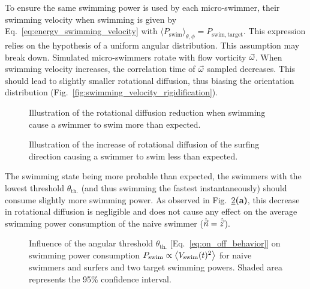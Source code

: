 To ensure the same swimming power is used by each micro-swimmer, their swimming velocity when swimming is given by Eq.~\eqref{eq:energy_swimming_velocity} with $\langle P_{\mathrm{swim}} \rangle_{\theta, \phi} = P_{\mathrm{swim}, \mathrm{target}}$.
This expression relies on the hypothesis of a uniform angular distribution.
This assumption may break down.
Simulated micro-swimmers rotate with flow vorticity $\vec{\omega}$. 
When swimming velocity increases, the correlation time of $\vec{\omega}$ sampled decreases.
This should lead to slightly smaller rotational diffusion, thus biasing the orientation distribution (Fig.~\ref{fig:swimming_velocity_rigidification}).
\begin{figure}
	\centering
	\begin{minipage}{0.5\textwidth}
		\centering
		\def\svgwidth{0.6\textwidth}
		
		\captionsetup{width=0.9\textwidth}
	  	\caption{Illustration of the rotational diffusion reduction when swimming cause a swimmer to swim more than expected.}
	  	\label{fig:swimming_velocity_rigidification}
	\end{minipage}%
	\begin{minipage}{0.5\textwidth}
		\centering
		\def\svgwidth{0.6\textwidth}
		
		\captionsetup{width=0.9\textwidth}
	  	\caption{Illustration of the increase of rotational diffusion of the surfing direction causing a swimmer to swim less than expected.}
	  	\label{fig:swimming_velocity_surfing_flexification}
	\end{minipage}
\end{figure}
The swimming state being more probable than expected, the swimmers with the lowest threshold $\theta_{\mathrm{th.}}$ (and thus swimming the fastest instantaneously) should consume slightly more swimming power.
As observed in Fig.~\ref{fig:energy_efficiency_threshold_power}\textbf{(a)}, this decrease in rotational diffusion is negligible and does not cause any effect on the average swimming power consumption of the naive swimmer ($\hat{\vec{n}} = \hat{\vec{z}}$).
\begin{figure}%
	\centering
	
	\caption[Influence of the angular threshold on swimming power consumption.]{
		Influence of the angular threshold $\theta_{\mathrm{th.}}$ [Eq.~\eqref{eq:on_off_behavior}] on swimming power consumption $P_{\mathrm{swim}} \propto \left\langle V_{\mathrm{swim}}(t)^2 \right\rangle$ for naive swimmers and surfers and two target swimming powers.
		Shaded area represents the 95\% confidence interval.
	}
	\label{fig:energy_efficiency_threshold_power}
\end{figure}

